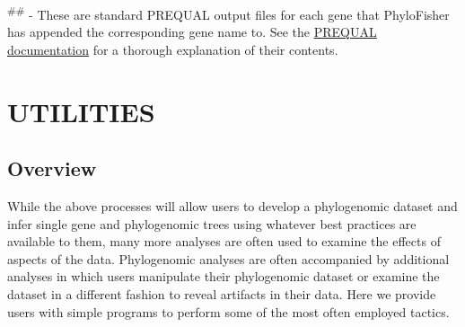 \documentclass{article}
\begin{document}
\begin{enumerate}[itemsep=12pt]
\begin{description}
\begin{itemize}
\begin{itemize}
\begin{enumerate}[label=\arabic*.]
        \end{enumerate}
        \end{itemize}
    \end{itemize}
        \vspace{0.2cm}
        \textsuperscript{\#\#} - These are standard PREQUAL output files for each gene that PhyloFisher has appended the corresponding gene name to. See the \href{http://amoeba.msstate.edu/phylofisher/pdfs/prequal.pdf}{PREQUAL documentation} for a thorough explanation of their contents.
        \vspace{0.2cm}
    \end{description}
    \end{enumerate}
    
    \pagebreak
    
    \section{UTILITIES}
    \subsection{Overview}
    While the above processes will allow users to develop a phylogenomic dataset and infer single gene and phylogenomic trees using whatever best practices are available to them, many more analyses are often used to examine the effects of aspects of the data. Phylogenomic analyses are often accompanied by additional analyses in which users manipulate their phylogenomic dataset or examine the dataset in a different fashion to reveal artifacts in their data. Here we provide users with simple programs to perform some of the most often employed tactics. 
    
\end{document}
